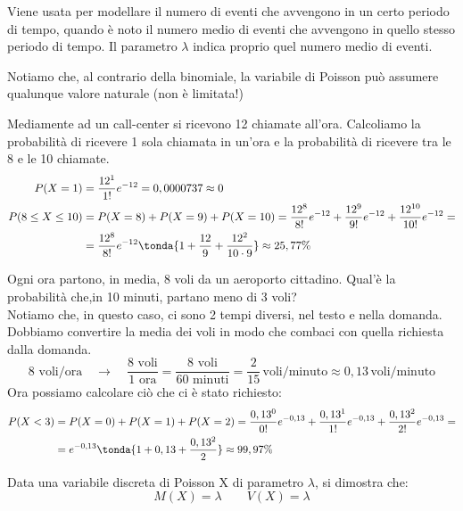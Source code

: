 Viene usata per modellare il numero di eventi che avvengono in un certo periodo di tempo, quando è noto il numero medio di eventi che avvengono in quello stesso periodo di tempo. Il parametro $\lambda$ indica proprio quel numero medio di eventi.

\begin{osservazione} Notiamo che, al contrario della binomiale, la variabile di Poisson può assumere qualunque valore naturale (non è limitata!)
\end{osservazione}

\begin{esempio} Mediamente ad un call-center si ricevono 12 chiamate all'ora. Calcoliamo la probabilità di ricevere 1 sola chiamata in un'ora e la probabilità di ricevere tra le 8 e le 10 chiamate.
\[\begin{split}P(X=1) &= \dfrac{12^1}{1!} e^{-12} = 0,0000737 \approx 0 \\
P(8\leq X\leq 10) &= P(X = 8)+P(X=9)+P(X=10) = \dfrac{12^8}{8!} e^{-12} + \dfrac{12^9}{9!} e^{-12} + \dfrac{12^{10}}{10!} e^{-12} =\\
&= \dfrac{12^8}{8!} e^{-12} \tonda{1+\dfrac{12}{9}+\dfrac{12^2}{10\cdot 9}} \approx 25,77 \%\end{split}\]
\end{esempio}

\begin{esempio} Ogni ora partono, in media, 8 voli da un aeroporto cittadino. Qual'è la probabilità che,in 10 minuti, partano meno di 3 voli?\\[5pt]
Notiamo che, in questo caso, ci sono 2 tempi diversi, nel testo e nella domanda. Dobbiamo convertire la media dei voli in modo che combaci con quella richiesta dalla domanda.
\[\text{8 voli/ora} \quad \longrightarrow \quad \dfrac{\text{8 voli}}{\text{1 ora}}=\dfrac{\text{8 voli}}{\text{60 minuti}} = \dfrac{2}{15}\,\text{voli/minuto} \approx 0,13\,\text{voli/minuto}\]
Ora possiamo calcolare ciò che ci è stato richiesto:
\[\begin{split}P(X<3) &= P(X=0)+P(X=1)+P(X=2) = \dfrac{0,13^{0}}{0!} e^{-0,13}+\dfrac{0,13^{1}}{1!} e^{-0,13}+\dfrac{0,13^{2}}{2!} e^{-0,13}=\\
&= e^{-0,13} \tonda{1+0,13+\dfrac{0,13^2}{2}} \approx 99,97 \% \end{split}\]
\end{esempio}

\begin{proprieta} Data una variabile discreta di Poisson X di parametro $\lambda$, si dimostra che: 
\[\boxed{M(X) = \lambda} \qquad \boxed{V(X) = \lambda}\]
\end{proprieta}

